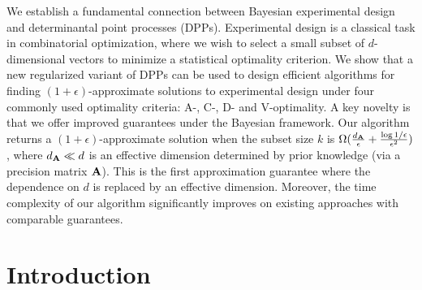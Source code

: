 \documentclass[thesis.tex]{subfiles}
\begin{document}



We establish a fundamental connection between Bayesian
experimental design and determinantal point processes
(DPPs). Experimental design is a classical task in combinatorial
optimization, where we wish to select a small subset of $d$-dimensional
 vectors to minimize a statistical optimality criterion.
 We show that a new regularized variant of
 DPPs can be used to design
efficient algorithms for finding $(1+\epsilon)$-approximate solutions
to experimental design under four commonly used optimality
criteria: A-, C-, D- and V-optimality. A key novelty is that we offer
improved guarantees under the Bayesian framework.
Our algorithm returns a $(1+\epsilon)$-approximate solution when the
subset size $k$ is
$\Omega(\frac{d_{\mathbf A}}{\epsilon} + \frac{\log
1/\epsilon}{\epsilon^2})$, where $d_{\mathbf A}\ll d$ is an effective dimension
determined by prior knowledge (via a precision matrix $\mathbf A$). This is the first
approximation guarantee where the dependence on $d$ is
replaced by an effective dimension. Moreover, the time complexity
of our algorithm significantly improves on existing approaches
with comparable guarantees. 


\section{Introduction}
\end{document}
